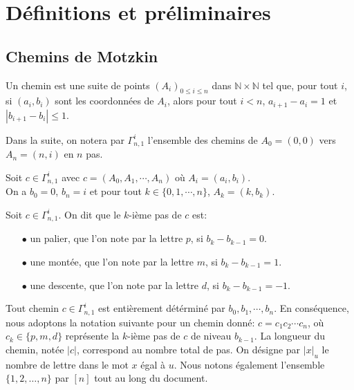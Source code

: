 \chapter{Définitions et préliminaires}
\section{Chemins de Motzkin}

\begin{definition}
	\begin{rm}
		Un chemin est une suite de points $(A_{i})_{0 \leq i \leq n}$ dans $\mathbb{N}\times \mathbb{N}$ tel que, pour tout $i$, si $
			(a_{i}, b_{i})$ sont les coordonnées de $A_{i}$, alors pour tout $i<n$, $a_{i+1} - a_{i}=1$ et $|b_{i+1} - b_{i}| \leq 1$.
	\end{rm}
\end{definition}
Dans la suite, on notera par $\Gamma_{n,1}^{i}$ l'ensemble des chemins de $A_{0} = (0,0)$ vers $A_{n} = (n,i)$ en $n$ pas.

\begin{property}
	Soit $c \in \Gamma_{n,1}^{i}$ avec $c=(A_{0},A_{1}, \cdots, A_{n})$ où $A_{i}=(a_{i}, b_{i})$.\\
	On a $b_{0}=0$, $b_{n}=i$ et pour tout $k \in \{0, 1, \cdots, n\}$, $A_{k} = (k, b_{k})$.
\end{property}

\begin{definition} \label{path_char}
	\begin{rm}
		Soit $c \in \Gamma_{n,1}^{i}$. On dit que le $k$-ième pas de $c$ est:
		\begin{itemize}
			\item[$\bullet$] un palier, que l'on note par la lettre $p$, si $b_{k}- b_{k-1} = 0$.
			\item[$\bullet$] une montée, que l'on note par la lettre $m$, si $b_{k}- b_{k-1} = 1$.
			\item[$\bullet$] une descente, que l'on note par la lettre $d$, si $b_{k}- b_{k-1} = -1$.
		\end{itemize}
	\end{rm}
\end{definition}
Tout chemin $c \in \Gamma_{n,1}^{i}$ est entièrement détérminé par $b_{0}, b_{1}, \cdots, b_{n}$.
En conséquence, nous adoptons la notation suivante pour un chemin donné:
$c = c_{1}c_{2}\cdots c_{n}$, où $c_{k} \in \{p, m, d\}$ représente la $k$-ième pas de $c$ de niveau $b_{k-1}$. La longueur du chemin, notée $|c|$, correspond au nombre total de pas. On désigne par $|x|_{u}$ le nombre de lettre dans le mot $x$ égal à $u$. Nous notons également l'ensemble $\{1, 2, \ldots, n\}$ par $[n]$ tout au long du document.

